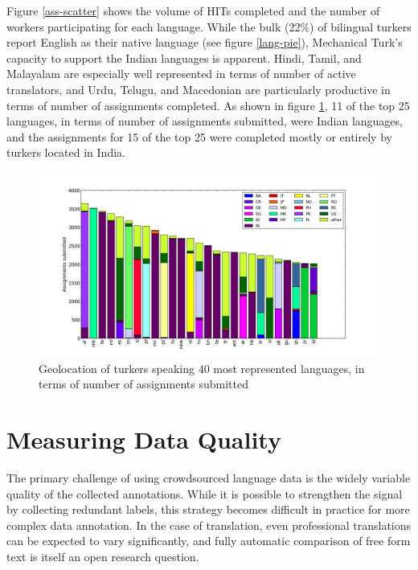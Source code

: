 \documentclass[11pt]{article}
\begin{document}
Figure \ref{ass-scatter} shows the volume of HITs completed and the number of workers participating for each language. While the bulk (22\%) of bilingual turkers report English as their native language (see figure \ref{lang-pie}), Mechanical Turk's capacity to support the Indian languages is apparent. Hindi, Tamil, and Malayalam are especially well represented in terms of number of active translators, and Urdu, Telugu, and Macedonian are particularly productive in terms of number of assignments completed. As shown in figure \ref{langgeo-bar}, 11 of the top 25 languages, in terms of number of assignments submitted, were Indian languages, and the assignments for 15 of the top 25 were completed mostly or entirely by turkers located in India. 

\begin{figure}[h]
\centering
\includegraphics[width=6in]{figures/assign-langgeo-sorted}
\caption{Geolocation of turkers speaking 40 most represented languages, in terms of number of assignments submitted}
\label{langgeo-bar}
\end{figure}

\section{Measuring Data Quality}
The primary challenge of using crowdsourced language data is the widely variable quality of the collected annotations. While it is possible to strengthen the signal by collecting redundant labels, this strategy becomes difficult in practice for more complex data annotation. In the case of translation, even professional translations can be expected to vary significantly, and fully automatic comparison of free form text is itself an open research question.
\end{document}
